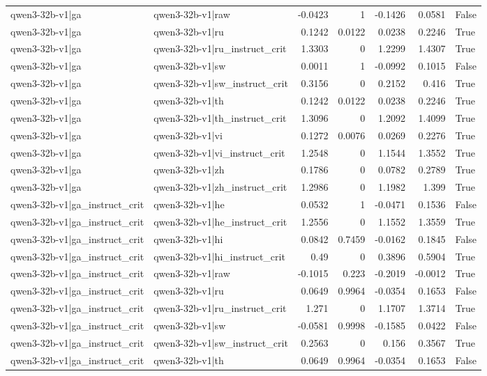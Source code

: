\begin{table}
\begin{tabular}{l l r r r r l}
qwen3-32b-v1|ga & qwen3-32b-v1|raw & -0.0423 & 1 & -0.1426 & 0.0581 & False \\
qwen3-32b-v1|ga & qwen3-32b-v1|ru & 0.1242 & 0.0122 & 0.0238 & 0.2246 & True \\
qwen3-32b-v1|ga & qwen3-32b-v1|ru_instruct_crit & 1.3303 & 0 & 1.2299 & 1.4307 & True \\
qwen3-32b-v1|ga & qwen3-32b-v1|sw & 0.0011 & 1 & -0.0992 & 0.1015 & False \\
qwen3-32b-v1|ga & qwen3-32b-v1|sw_instruct_crit & 0.3156 & 0 & 0.2152 & 0.416 & True \\
qwen3-32b-v1|ga & qwen3-32b-v1|th & 0.1242 & 0.0122 & 0.0238 & 0.2246 & True \\
qwen3-32b-v1|ga & qwen3-32b-v1|th_instruct_crit & 1.3096 & 0 & 1.2092 & 1.4099 & True \\
qwen3-32b-v1|ga & qwen3-32b-v1|vi & 0.1272 & 0.0076 & 0.0269 & 0.2276 & True \\
qwen3-32b-v1|ga & qwen3-32b-v1|vi_instruct_crit & 1.2548 & 0 & 1.1544 & 1.3552 & True \\
qwen3-32b-v1|ga & qwen3-32b-v1|zh & 0.1786 & 0 & 0.0782 & 0.2789 & True \\
qwen3-32b-v1|ga & qwen3-32b-v1|zh_instruct_crit & 1.2986 & 0 & 1.1982 & 1.399 & True \\
qwen3-32b-v1|ga_instruct_crit & qwen3-32b-v1|he & 0.0532 & 1 & -0.0471 & 0.1536 & False \\
qwen3-32b-v1|ga_instruct_crit & qwen3-32b-v1|he_instruct_crit & 1.2556 & 0 & 1.1552 & 1.3559 & True \\
qwen3-32b-v1|ga_instruct_crit & qwen3-32b-v1|hi & 0.0842 & 0.7459 & -0.0162 & 0.1845 & False \\
qwen3-32b-v1|ga_instruct_crit & qwen3-32b-v1|hi_instruct_crit & 0.49 & 0 & 0.3896 & 0.5904 & True \\
qwen3-32b-v1|ga_instruct_crit & qwen3-32b-v1|raw & -0.1015 & 0.223 & -0.2019 & -0.0012 & True \\
qwen3-32b-v1|ga_instruct_crit & qwen3-32b-v1|ru & 0.0649 & 0.9964 & -0.0354 & 0.1653 & False \\
qwen3-32b-v1|ga_instruct_crit & qwen3-32b-v1|ru_instruct_crit & 1.271 & 0 & 1.1707 & 1.3714 & True \\
qwen3-32b-v1|ga_instruct_crit & qwen3-32b-v1|sw & -0.0581 & 0.9998 & -0.1585 & 0.0422 & False \\
qwen3-32b-v1|ga_instruct_crit & qwen3-32b-v1|sw_instruct_crit & 0.2563 & 0 & 0.156 & 0.3567 & True \\
qwen3-32b-v1|ga_instruct_crit & qwen3-32b-v1|th & 0.0649 & 0.9964 & -0.0354 & 0.1653 & False \\

\end{tabular}
\end{table}
